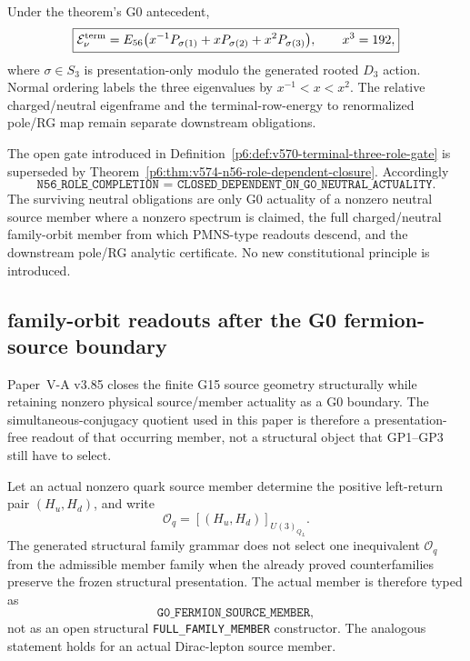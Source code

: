 \documentclass[12pt,a4paper]{article}
\begin{document}
\begin{corollary}
\label{p6:cor:v574-e56-terminal-spectrum}
Under the theorem's G0 antecedent,
\[
 \boxed{
 \mathcal E_\nu^{\rm term}
 =E_{56}\bigl(x^{-1}P_{\sigma(1)}+xP_{\sigma(2)}+x^2P_{\sigma(3)}\bigr),
 \qquad x^3=192,
 }
\]
where \(\sigma\in S_3\) is presentation-only modulo the generated rooted
\(D_3\) action.  Normal ordering labels the three eigenvalues by
\(x^{-1}<x<x^2\).  The relative charged/neutral eigenframe and the
terminal-row-energy to renormalized pole/RG map remain separate downstream
obligations.
\end{corollary}

\begin{remark}
\label{p6:rem:v574-corrected-neutral-frontier}
The open gate introduced in Definition~\ref{p6:def:v570-terminal-three-role-gate}
is superseded by Theorem~\ref{p6:thm:v574-n56-role-dependent-closure}.
Accordingly
\[
 \boxed{\texttt{N56\_ROLE\_COMPLETION = CLOSED\_DEPENDENT\_ON\_G0\_NEUTRAL\_ACTUALITY}.}
\]
The surviving neutral obligations are only G0 actuality of a nonzero neutral
source member where a nonzero spectrum is claimed, the full charged/neutral
family-orbit member from which PMNS-type readouts descend, and the downstream
pole/RG analytic certificate.  No new constitutional principle is introduced.
\end{remark}


\subsection{family-orbit readouts after the G0 fermion-source boundary}
\label{p6:sec:v578-family-member-g0-retyping}

Paper~V-A v3.85 closes the finite G15 source geometry structurally while
retaining nonzero physical source/member actuality as a G0 boundary.  The
simultaneous-conjugacy quotient used in this paper is therefore a
presentation-free readout of that occurring member, not a structural object
that GP1--GP3 still have to select.

\begin{theorem}
\label{p6:thm:v578-family-member-g0-retyping}
Let an actual nonzero quark source member determine the positive left-return
pair $(H_u,H_d)$, and write
\[
 \mathcal O_q=[(H_u,H_d)]_{U(3)_{Q_L}}.
\]
The generated structural family grammar does not select one inequivalent
$\mathcal O_q$ from the admissible member family when the already proved
counterfamilies preserve the frozen structural presentation.  The actual
member is therefore typed as
\[
 \boxed{\texttt{G0\_FERMION\_SOURCE\_MEMBER}},
\]
not as an open structural \texttt{FULL\_FAMILY\_MEMBER} constructor.
The analogous statement holds for an actual Dirac-lepton source member.
\end{theorem}
\end{document}
